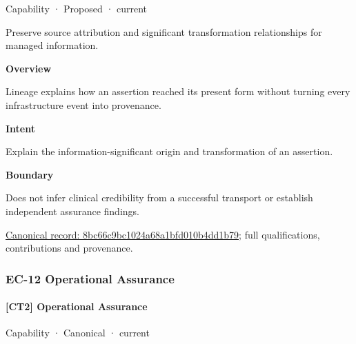 \label{element:8bc66c9bc1024a68a1bfd010b4dd1b79}
{\small Capability · Proposed · current}\par

Preserve source attribution and significant transformation relationships for managed information.



\textbf{Overview}



Lineage explains how an assertion reached its present form without turning every infrastructure event into provenance.



\textbf{Intent}



Explain the information-significant origin and transformation of an assertion.



\textbf{Boundary}



Does not infer clinical credibility from a successful transport or establish independent assurance findings.


{\footnotesize \href{../../../../continuum/strategy/capability/8bc66c9bc1024a68a1bfd010b4dd1b79.md}{Canonical record: 8bc66c9bc1024a68a1bfd010b4dd1b79}; full qualifications, contributions and provenance.}\par
\subsubsection{EC-12 Operational Assurance}

\paragraph{[CT2] Operational Assurance}

\label{element:938cd44380ab431fa8dae13c702d83c1}
{\small Capability · Canonical · current}\par

